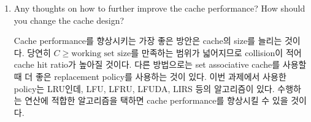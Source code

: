 \documentclass[
    a4paper,
    oneside,
    adjustmath,
    finemath,
    itemph,
    nonfrench,
    11pt
]{oblivoir}
\begin{document}
\begin{enumerate}
        \item Any thoughts on how to further improve the cache performance?
        How should you change the cache design?

        Cache performance를 향상시키는 가장 좋은 방안은 cache의 size를 늘리는 것이다.
        당연히 $C \ge \text{working set size}$를 만족하는 범위가 넓어지므로 collision이 적어 cache hit ratio가 높아질 것이다.
        다른 방법으로는 set associative cache를 사용할 때 더 좋은 replacement policy를 사용하는 것이 있다.
        이번 과제에서 사용한 policy는 LRU인데, LFU, LFRU, LFUDA, LIRS 등의 알고리즘이 있다.
        수행하는 연산에 적합한 알고리즘을 택하면 cache performance를 향상시킬 수 있을 것이다.
    \end{enumerate}
\end{document}
